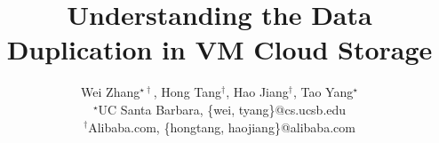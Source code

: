 \documentclass[finalversion]{usetex-v1}
\begin{document}
\title{Understanding the Data Duplication in VM Cloud Storage}
\author{
Wei Zhang$^{\star\dagger}$, Hong Tang$^\dagger$, Hao Jiang$^\dagger$, Tao Yang$^\star$\\
   {\normalsize $^\star$UC Santa Barbara, \{wei, tyang\}@cs.ucsb.edu}\\
   {\normalsize$^\dagger$Alibaba.com, \{hongtang, haojiang\}@alibaba.com}
}
\date{}
\maketitle





%
%
%




{\small


}
\end{document}
